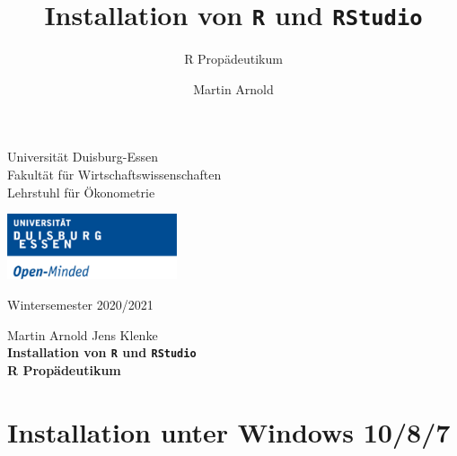 \documentclass[12pt,a4paper]{article}
\title{Installation von \texttt{R} und \texttt{RStudio}}
\subtitle{R Propädeutikum}
\author{Martin Arnold}
\date{}
\begin{document}

\restoregeometry



\begin{minipage}{0.6\textwidth}
Universität Duisburg-Essen\\
Fakultät für Wirtschaftswissenschaften\\
Lehrstuhl für Ökonometrie\\
\end{minipage}

	\begin{flushright}
	\vspace{-3cm}
	\includegraphics*[width=5cm]{Includes/duelogo_en.png}\\
	\vspace{.125cm}
	\end{flushright}
\hspace{-0.005cm}Wintersemester 2020/2021

\vspace{0.05cm}

\begin{center}
	\vspace{.25cm}
	Martin Arnold \hspace{.5cm} Jens Klenke \\
	\vspace{.25cm}
	\textbf{\Large{Installation von \texttt{R} und \texttt{RStudio}}}\\
	\vspace{.25cm}
	\textbf{\large{R Propädeutikum}}\\
	\vspace{.125cm}
\end{center}





\hypertarget{installation-unter-windows-1087}{%
\section{Installation unter Windows
10/8/7}\label{installation-unter-windows-1087}}
\end{document}
